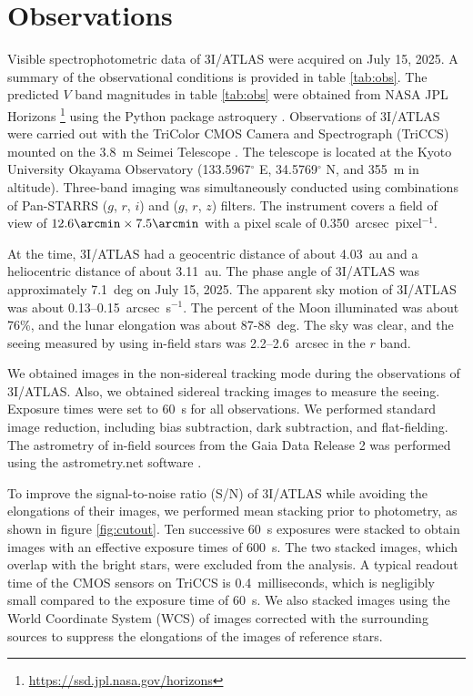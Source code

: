 \documentclass[]{pasj02}
\newcommand\I{3I/ATLAS\xspace}
\begin{document}
\section{Observations}\label{sec:obs}
Visible spectrophotometric data of \I were acquired on July 15, 2025.
A summary of the observational conditions is provided in table \ref{tab:obs}.
The predicted $V$ band magnitudes in table \ref{tab:obs} were obtained from NASA JPL Horizons \footnote{\url{https://ssd.jpl.nasa.gov/horizons}} using the Python package astroquery \citep{Ginsburg2019}.
Observations of \I were carried out with the TriColor CMOS Camera and Spectrograph (TriCCS) mounted on the 3.8~m Seimei Telescope \citep{Kurita2020}.
The telescope is located at the Kyoto University Okayama Observatory (133.5967$^\circ$ E, 34.5769$^\circ$ N, and 355~m in altitude).
Three-band imaging was simultaneously conducted using combinations of Pan-STARRS ($g$, $r$, $i$) and ($g$, $r$, $z$) filters.
The instrument covers a field of view of $12.6\arcmin \times 7.5\arcmin$ with a pixel scale of 0.350~arcsec~pixel$^{-1}$.

At the time, \I had a geocentric distance of about 4.03~au and a heliocentric distance of about 3.11~au.
The phase angle of \I was approximately 7.1~deg on July 15, 2025.
The apparent sky motion of \I was about 0.13--0.15~arcsec~s$^{-1}$.
The percent of the Moon illuminated was about 76\%, and the lunar elongation was about 87-88~deg.
The sky was clear, and the seeing measured by using in-field stars was 2.2--2.6~arcsec in the $r$ band.

We obtained images in the non-sidereal tracking mode during the observations of \I.
Also, we obtained sidereal tracking images to measure the seeing.
Exposure times were set to 60~s for all observations.
We performed standard image reduction, including bias subtraction, dark subtraction, and flat-fielding.
The astrometry of in-field sources from the Gaia Data Release 2 was performed using the astrometry.net software \citep{Lang2010}.

To improve the signal-to-noise ratio (S/N) of \I while avoiding the elongations of their images, we performed mean stacking prior to photometry, as shown in figure \ref{fig:cutout}.
Ten successive 60~s exposures were stacked to obtain images with an effective exposure times of 600~s.
The two stacked images, which overlap with the bright stars, were excluded from the analysis.
A typical readout time of the CMOS sensors on TriCCS is 0.4~milliseconds,
which is negligibly small compared to the exposure time of 60~s.
We also stacked images using the World Coordinate System (WCS) of images corrected with the surrounding sources to suppress the elongations of the images of reference stars.
\end{document}
